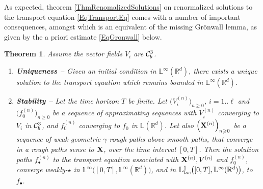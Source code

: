 \documentclass[11pt,a4paper]{amsart}
\newcommand{\RR}{\mathbb{R}}  \newcommand{\CC}{\mathbb{C}}  \newcommand{\LL}{\mathbb{L}}  \newcommand{\WW}{\mathbb{W}}
\renewcommand{\geq}{\geqslant}
\newtheorem{thm}{\hspace{-0.15cm}  {\sc Theorem} } %
\numberwithin{equation}{section} %
\begin{document}
\medskip

As expected, theorem \ref{ThmRenomalizedSolutions} on renormalized solutions to the transport equation \eqref{EqTransportEq} comes with a number of important consequences, amongst which is an equivalent of the missing Gr\"onwall lemma, as given by the a priori estimate \eqref{EqGronwall} below.

\begin{thm}
\label{ThmUniqueness} 
Assume the vector fields $V_i$ are $\mathcal{C}^3_b$. \vspace{0.1cm}
\begin{enumerate}
   \item {\bf Uniqueness --} Given an initial condition in $\LL^\infty(\RR^d)$, there exists a unique solution to the transport equation which remains bounded in $\LL^\infty(\RR^d)$.  \vspace{0.2cm}
   \item {\bf Stability --} Let the time horizon $T$ be finite. Let $\Big(V^{(n)}_i\Big)_{n\geq 0}$, $i=1..\ell$ and $\Big(f^{(n)}_0\Big)_{n\geq 0}$ be a sequence of approximating sequences with $V^{(n)}_i$ converging to $V_i$ in $\mathcal{C}^3_b$, and $f^{(n)}_0$ converging to $f_0$ in $\LL(\RR^d)$. Let also $\Big({\bfX}^{(n)}\Big)_{n\geq 0}$ be a sequence of weak geometric $\gamma$-rough paths above smooth paths, that converge in a rough paths sense to ${\bf X}$, over the time interval $[0,T]$. Then the solution paths $f^{(n)}_\bullet$ to the transport equation associated with ${{\bf X}}^{(n)}, V^{(n)}$ and $f^{(n)}_0$, converge weakly-$\star$ in $\LL^\infty\big([0,T],\LL^\infty(\RR^d)\big)$, and in $\LL^1_\textrm{\emph{loc}}\big([0,T],\LL^\infty(\RR^d)\big)$, to $f_\bullet$.
\end{enumerate}
\end{thm}

\medskip
\end{document}
